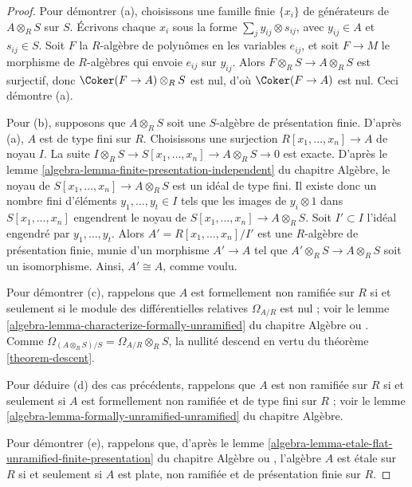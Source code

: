 \begin{proof}
Pour démontrer (a), choisissons une famille finie $\{x_i\}$ de générateurs
de $A \otimes_R S$ sur $S$.
Écrivons chaque $x_i$ sous la forme $\sum_j y_{ij} \otimes s_{ij}$,
avec $y_{ij} \in A$ et $s_{ij} \in S$.
Soit $F$ la $R$-algèbre de polynômes en les variables $e_{ij}$,
et soit $F \to M$ le morphisme de $R$-algèbres qui envoie
$e_{ij}$ sur $y_{ij}$. Alors $F \otimes_R S\to A \otimes_R S$ est surjectif,
donc $\Coker(F \to A) \otimes_R S$ est nul, d'où $\Coker(F \to A)$ est nul.
Ceci démontre (a).

\medskip\noindent
Pour (b), supposons que $A \otimes_R S$ soit une $S$-algèbre de présentation finie.
D'après (a), $A$ est de type fini sur $R$.
Choisissons une surjection $R[x_1, \ldots, x_n] \to A$ de noyau $I$.
La suite $I \otimes_R S \to S[x_1, \ldots, x_n] \to A \otimes_R S \to 0$
est exacte. D'après le lemme
\ref{algebra-lemma-finite-presentation-independent} du chapitre Algèbre,
le noyau de $S[x_1, \ldots, x_n] \to A \otimes_R S$
est un idéal de type fini.
Il existe donc un nombre fini d'éléments $y_1, \ldots, y_t \in I$
tels que les images de $y_i \otimes 1$ dans $S[x_1, \ldots, x_n]$
engendrent le noyau de $S[x_1, \ldots, x_n] \to A \otimes_R S$.
Soit $I' \subset I$ l'idéal engendré par $y_1, \ldots, y_t$.
Alors $A' = R[x_1, \ldots, x_n]/I'$ est une $R$-algèbre de présentation finie,
munie d'un morphisme $A' \to A$ tel que
$A' \otimes_R S \to A \otimes_R S$ soit un isomorphisme.
Ainsi, $A' \cong A$, comme voulu.

\medskip\noindent
Pour démontrer (c), rappelons que $A$ est formellement non ramifiée sur $R$
si et seulement si le module des différentielles relatives $\Omega_{A/R}$
est nul ; voir le lemme \ref{algebra-lemma-characterize-formally-unramified}
du chapitre Algèbre ou \cite[Proposition~17.2.1]{EGA4}.
Comme $\Omega_{(A \otimes_R S)/S} = \Omega_{A/R} \otimes_R S$,
la nullité descend en vertu du théorème \ref{theorem-descent}.

\medskip\noindent
Pour déduire (d) des cas précédents, rappelons que $A$ est non ramifiée
sur $R$ si et seulement si $A$ est formellement non ramifiée
et de type fini sur $R$ ; voir le lemme
\ref{algebra-lemma-formally-unramified-unramified} du chapitre Algèbre.

\medskip\noindent
Pour démontrer (e), rappelons que, d'après le lemme
\ref{algebra-lemma-etale-flat-unramified-finite-presentation} du chapitre Algèbre
ou \cite[Th\'eor\`eme~17.6.1]{EGA4}, l'algèbre $A$ est \'etale sur $R$
si et seulement si $A$ est plate, non ramifiée et de présentation finie sur $R$.
\end{proof}

